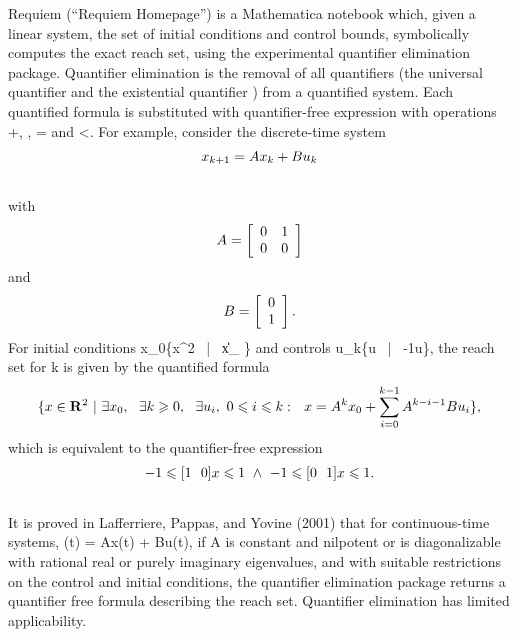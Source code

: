 \documentclass[letterpaper,10pt,english]{sphinxmanual}
\begin{document}
Requiem (“Requiem Homepage”) is a Mathematica notebook which, given a
linear system, the set of initial conditions and control bounds,
symbolically computes the exact reach set, using the experimental
quantifier elimination package. Quantifier elimination is the removal of
all quantifiers (the universal quantifier \forall and the
existential quantifier \exists) from a quantified system. Each
quantified formula is substituted with quantifier-free expression with
operations +, \times, = and <. For
example, consider the discrete-time system
\begin{gather}
\begin{split}x_{k+1} = Ax_k + Bu_k\end{split}\notag\\\begin{split}\end{split}\notag
\end{gather}
with
\begin{gather}
\begin{split}A=\left[\begin{array}{cc}
0 & 1\\
0 & 0\end{array}\right]\end{split}\notag
\end{gather}
and
\begin{gather}
\begin{split}B=\left[\begin{array}{c}
0\\
1\end{array}\right].\end{split}\notag
\end{gather}
For initial conditions x_0\in\{x^2 ~|~ \|x\|_{\infty} \} and
controls u_k\in\{u ~|~ -1\leqslant u\}, the
reach set for k is given by the quantified formula
\begin{gather}
\begin{split}\{ x\in{\bf R}^2 ~|~ \exists x_0, ~~ \exists k\geqslant0, ~~
\exists u_i, ~ 0\leqslant i\leqslant k: ~~
x = A^kx_0+\sum_{i=0}^{k-1}A^{k-i-1}Bu_i \},\end{split}\notag
\end{gather}
which is equivalent to the quantifier-free expression
\begin{gather}
\begin{split}-1\leqslant[1 ~~ 0]x\leqslant1 ~ \wedge ~ -1\leqslant[0 ~~ 1]x\leqslant1.\end{split}\notag\\\begin{split}\end{split}\notag
\end{gather}
It is proved in Lafferriere, Pappas, and Yovine (2001) that for
continuous-time systems, (t) = Ax(t) + Bu(t), if
A is constant and nilpotent or is diagonalizable with rational
real or purely imaginary eigenvalues, and with suitable restrictions on
the control and initial conditions, the quantifier elimination package
returns a quantifier free formula describing the reach set. Quantifier
elimination has limited applicability.
\end{document}
